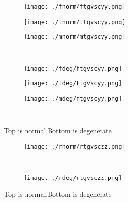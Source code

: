 \documentclass[aps,floats,floatfix,nofootinbib]{revtex4-1}
\begin{document}
\begin{center}
\begin{figure}
\begin{subfigure}{0.3\textwidth}
\texttt{[image: ./fnorm/ftgvscyy.png]}
\label{}
\end{subfigure}
\begin{subfigure}{0.3\textwidth}
\texttt{[image: ./tnorm/ttgvscyy.png]}
\label{}
\end{subfigure}
\begin{subfigure}{0.3\textwidth}
\texttt{[image: ./mnorm/mtgvscyy.png]}
\label{}
\end{subfigure}\\
\begin{subfigure}{0.3\textwidth}
\texttt{[image: ./fdeg/ftgvscyy.png]}
\label{}
\end{subfigure}
\begin{subfigure}{0.3\textwidth}
\texttt{[image: ./tdeg/ttgvscyy.png]}
\label{}
\end{subfigure}
\begin{subfigure}{0.3\textwidth}
\texttt{[image: ./mdeg/mtgvscyy.png]}
\label{}
\end{subfigure}\\
\caption{Top is normal,Bottom is degenerate}
\end{figure}
\end{center}

\begin{center}
\begin{figure}
\begin{subfigure}{0.95\textwidth}
\texttt{[image: ./rnorm/rtgvsczz.png]}
\label{}
\end{subfigure}\\
\begin{subfigure}{0.95\textwidth}
\texttt{[image: ./rdeg/rtgvsczz.png]}
\label{}
\end{subfigure}
\caption{Top is normal,Bottom is degenerate}
\end{figure}
\end{center}
\end{document}
